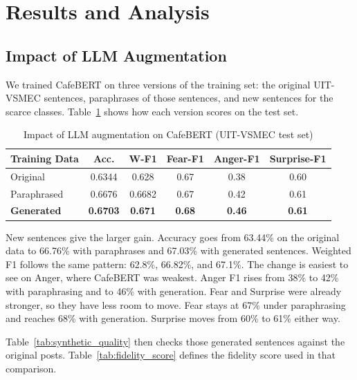 \documentclass[conference]{IEEEtran}
\begin{document}
\section{Results and Analysis}

\subsection{Impact of LLM Augmentation}

We trained CafeBERT on three versions of the training set: the original UIT-VSMEC sentences, paraphrases of those sentences, and new sentences for the scarce classes. Table~\ref{tab:augmentation} shows how each version scores on the test set.

\begin{table}[H]
\caption{Impact of LLM augmentation on CafeBERT (UIT-VSMEC test set)}
\label{tab:augmentation}
\centering
\begin{tabular}{@{}lccccc@{}}
\toprule
Training Data & Acc. & W-F1 & Fear-F1 & Anger-F1 & Surprise-F1 \\
\midrule
Original      & 0.6344 & 0.628 & 0.67 & 0.38 & 0.60 \\
Paraphrased   & 0.6676 & 0.6682 & 0.67 & 0.42 & 0.61 \\
\textbf{Generated}    & \textbf{0.6703} & \textbf{0.671} & \textbf{0.68} & \textbf{0.46} & \textbf{0.61} \\
\bottomrule
\end{tabular}
\end{table}

New sentences give the larger gain. Accuracy goes from 63.44\% on the original data to 66.76\% with paraphrases and 67.03\% with generated sentences. Weighted F1 follows the same pattern: 62.8\%, 66.82\%, and 67.1\%. The change is easiest to see on Anger, where CafeBERT was weakest. Anger F1 rises from 38\% to 42\% with paraphrasing and to 46\% with generation. Fear and Surprise were already stronger, so they have less room to move. Fear stays at 67\% under paraphrasing and reaches 68\% with generation. Surprise moves from 60\% to 61\% either way.

Table~\ref{tab:synthetic_quality} then checks those generated sentences against the original posts. Table~\ref{tab:fidelity_score} defines the fidelity score used in that comparison.
\end{document}
